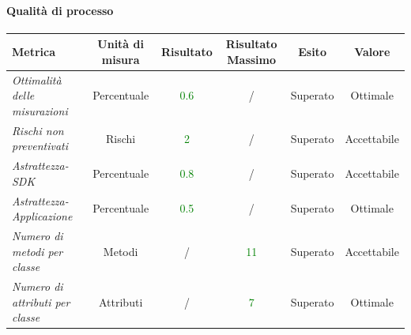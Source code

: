 \paragraph{Qualità di processo}
\begin{longtable}{|>{\centering}m{5cm}|c|c|c|c|c|}
\hline
\textbf{Metrica} & \textbf{Unità di misura} & \textbf{Risultato} & \textbf{Risultato Massimo} & \textbf{Esito} & \textbf{Valore}\\
\hline
\endhead

\emph{Ottimalità delle misurazioni} & {Percentuale} & \textcolor{Green}{0.6} & / & Superato & Ottimale \\ \hline
\emph{Rischi non preventivati} & {Rischi} & \textcolor{Green}{2} & / & Superato & Accettabile\\ \hline
\emph{Astrattezza-SDK} & {Percentuale} & \textcolor{Green}{0.8} & / & Superato & Accettabile\\ \hline
\emph{Astrattezza-Applicazione} & {Percentuale} & \textcolor{Green}{0.5} & / & Superato & Ottimale\\ \hline
\emph{Numero di metodi per classe} & {Metodi} & / &\textcolor{Green}{11} & Superato & Accettabile\\ \hline
\emph{Numero di attributi per classe} & {Attributi} & / &\textcolor{Green}{7} & Superato & Ottimale\\ \hline

\end{longtable}
